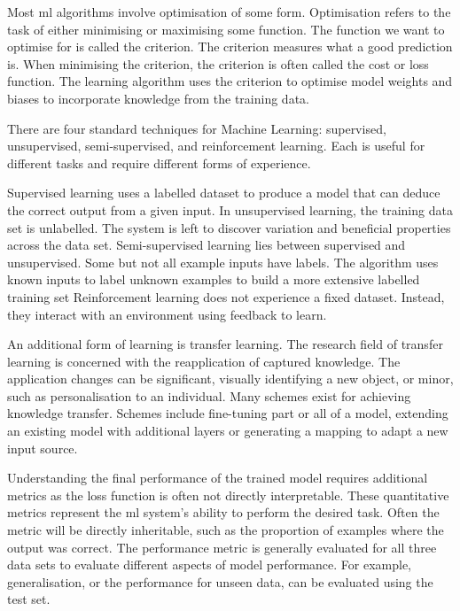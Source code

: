 Most \acrshort{ml} algorithms involve optimisation of some form. Optimisation refers to the task of either minimising or maximising some function. The function we want to optimise for is called the criterion. The criterion measures what a good prediction is. When minimising the criterion, the criterion is often called the cost or loss function.\cite{Goodfellow2015} The learning algorithm uses the criterion to optimise model weights and biases to incorporate knowledge from the training data.

There are four standard techniques for Machine Learning: supervised, unsupervised, semi-supervised, and reinforcement learning. Each is useful for different tasks and require different forms of experience.

Supervised learning uses a labelled dataset to produce a model that can deduce the correct output from a given input\cite{Burkov2019}. In unsupervised learning, the training data set is unlabelled. The system is left to discover variation and beneficial properties across the data set. Semi-supervised learning lies between supervised and unsupervised. Some but not all example inputs have labels. The algorithm uses known inputs to label unknown examples to build a more extensive labelled training set\cite{Abdallah2018} Reinforcement learning does not experience a fixed dataset. Instead, they interact with an environment using feedback to learn.

An additional form of learning is transfer learning. The research field of transfer learning is concerned with the reapplication of captured knowledge. The application changes can be significant, visually identifying a new object, or minor, such as personalisation to an individual. Many schemes exist for achieving knowledge transfer. Schemes include fine-tuning part or all of a model, extending an existing model with additional layers or generating a mapping to adapt a new input source.\cite{Farahani2020, Zhuang2021}

Understanding the final performance of the trained model requires additional metrics as the loss function is often not directly interpretable. These quantitative metrics represent the \acrshort{ml} system's ability to perform the desired task. Often the metric will be directly inheritable, such as the proportion of examples where the output was correct. The performance metric is generally evaluated for all three data sets to evaluate different aspects of model performance. For example, generalisation, or the performance for unseen data, can be evaluated using the test set.

